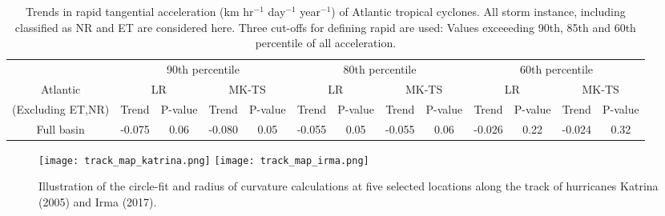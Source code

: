 \documentclass[wcd,manuscript]{copernicus}
\begin{document}
\begin{table*}[t]
  \caption{Trends in rapid tangential acceleration (km hr$^{-1}$ day$^{-1}$ year$^{-1}$) of Atlantic tropical cyclones. All storm instance, including classified as NR and ET are considered here. Three cut-offs for defining rapid are used: Values exceeeding 90th, 85th and 60th percentile of all acceleration. }

\begin{tabular}{|c|cccc|cccc|cccc|}
\hline
& \multicolumn{4}{|c|}{ 90th percentile } & \multicolumn{4}{|c|}{80th percentile }& \multicolumn{4}{|c|}{60th percentile}\\
Atlantic  & \multicolumn{2}{c}{LR} & \multicolumn{2}{c|}{MK-TS}& \multicolumn{2}{c}{LR} & \multicolumn{2}{c|}{MK-TS} & \multicolumn{2}{c}{LR} &  \multicolumn{2}{c|}{MK-TS}\\
(Excluding ET,NR) & Trend & P-value & Trend & P-value & Trend & P-value & Trend & P-value & Trend & P-value & Trend & P-value\\
\hline
Full basin &  -0.075 & 0.06 & -0.080 & 0.05 & -0.055 & 0.05 & -0.055 & 0.06  & -0.026 & 0.22 & -0.024 & 0.32\\


\hline
\hline
\end{tabular}
\label{tab:ATLAC}
\end{table*}





\clearpage


\begin{figure*}[t]
\texttt{[image: track\_map\_katrina.png]}
\texttt{[image: track\_map\_irma.png]}
\caption{Illustration of the circle-fit and radius of curvature calculations at
five selected locations along the track of hurricanes Katrina (2005) and Irma (2017).}\label{fig:track}
\end{figure*}


\clearpage
\end{document}
